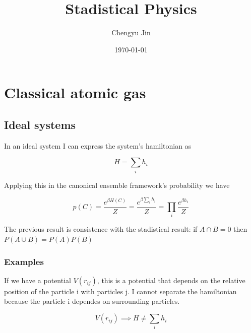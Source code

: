 \documentclass[12pt,a4paper]{report}
\title{Stadistical Physics }
\author{Chengyu Jin}
\date{\today}
\newcommand{\esp}{\vspace{0.5cm}}
\begin{document}
	
	\maketitle
	
	\tableofcontents
	\newpage
	
	\chapter{Classical atomic gas}
	
	\section{Ideal systems}
	
	\noindent In an ideal system I can express the system's hamiltonian as
	
	\esp
	
	\begin{equation}
		H = \sum_i h_i
	\end{equation}
	
	\esp
	
	\noindent Applying this in the canonical ensemble framework's probability we have
	
	\esp
	
	\begin{equation}
		p(C) = \frac{e^{\beta H(C)}}{Z} = \frac{e^{\beta \sum_i h_i}}{Z} = \prod _i \frac{e^{\beta h_i}}{Z}
	\end{equation}
	
	\esp
	
	\begin{nota}
		The previous result is consistence with the stadistical result: if $A \cap B = {0}$ then $P(A\cup B)=P(A)P(B)$
	\end{nota}
	
	\subsection{Examples}
	
	If we have a potential $V(r_{ij})$, this is a potential that depends on the relative position of the particle i with particles j. I cannot separate the hamiltonian because the particle i dependes on surrounding particles.
	
	\esp
	
	\begin{equation}
		V(r_{ij}) \implies H \neq \sum_i h_i
	\end{equation}
	
\end{document}
